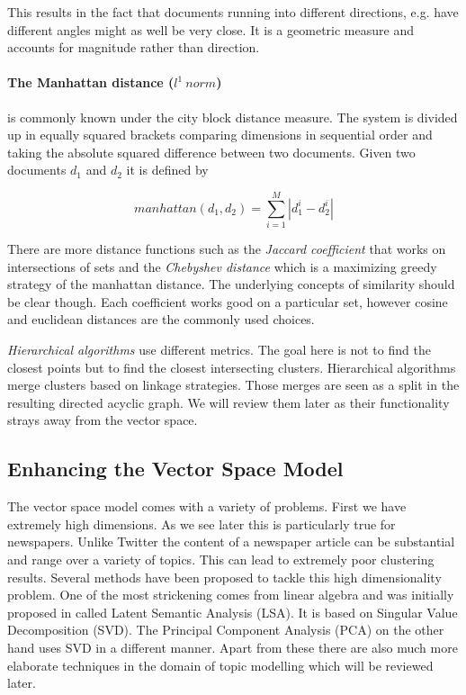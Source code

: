    This results in the fact that documents running into different directions, e.g. have different angles might as well be very close. It is a geometric measure and accounts for magnitude rather than direction.

    \paragraph{The Manhattan distance ($l^1\:norm$)} is commonly known under the city block distance measure. The system is divided up in equally squared brackets comparing dimensions in sequential order and taking the absolute squared difference between two documents. Given two documents $d_1$ and $d_2$ it is defined by

    \begin{equation}
      manhattan(d_1, d_2) = \sum_{i=1}^{M}|d_1^i - d_2^i|
    \end{equation}

    There are more distance functions such as the \emph{Jaccard coefficient} that works on intersections of sets and the \emph{Chebyshev distance} which is a maximizing greedy strategy of the manhattan distance. The underlying concepts of similarity should be clear though. Each coefficient works good on a particular set, however cosine and euclidean distances are the commonly used choices.

    \emph{Hierarchical algorithms} use different metrics. The goal here is not to find the closest points but to find the closest intersecting clusters. Hierarchical algorithms merge clusters based on linkage strategies. Those merges are seen as a split in the resulting directed acyclic graph. We will review them later as their functionality strays away from the vector space.

  \subsection{Enhancing the Vector Space Model}

    The vector space model comes with a variety of problems. First we have extremely high dimensions. As we see later this is particularly true for newspapers. Unlike Twitter the content of a newspaper article can be substantial and range over a variety of topics. This can lead to extremely poor clustering results. Several methods have been proposed to tackle this high dimensionality problem. One of the most strickening comes from linear algebra and was initially proposed in \cite{DeerwesterLSI1990} called Latent Semantic Analysis (LSA). It is based on Singular Value Decomposition (SVD). The Principal Component Analysis (PCA) on the other hand uses SVD in a different manner. Apart from these there are also much more elaborate techniques in the domain of topic modelling which will be reviewed later.

